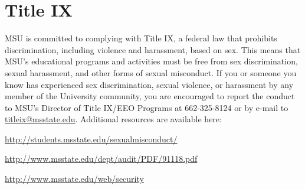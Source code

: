 \section{Title IX}

MSU is committed to complying with Title IX, a federal law that prohibits discrimination, including violence and harassment, based on sex.  This means that MSU’s educational programs and activities must be free from sex discrimination, sexual harassment, and other forms of sexual misconduct.  If you or someone you know has experienced sex discrimination, sexual violence, or harassment by any member of the University community, you are encouraged to report the conduct to MSU’s Director of Title IX/EEO Programs at 662-325-8124 or by e-mail to \url{titleix@msstate.edu}. Additional resources are available here:
\begin{description}
\item \url{http://students.msstate.edu/sexualmisconduct/}  
\item \url{http://www.msstate.edu/dept/audit/PDF/91118.pdf} 
\item \url{http://www.msstate.edu/web/security}
\end{description}